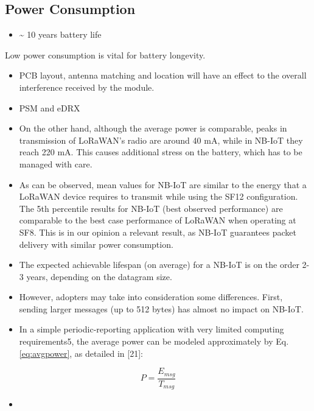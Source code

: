 \documentclass[]{article}
\providecommand{\tightlist}{%
  \setlength{\itemsep}{0pt}\setlength{\parskip}{0pt}}
\begin{document}
\hypertarget{power}{%
\subsection{Power Consumption}\label{power}}

\begin{itemize}
\tightlist
\item
  \textasciitilde{} 10 years battery life
\end{itemize}

Low power consumption is vital for battery longevity.

\begin{itemize}
\tightlist
\item
  PCB layout, antenna matching and location will have an effect to the
  overall interference received by the module.
\item
  PSM and eDRX
\item
  On the other hand, although the average power is comparable, peaks in
  transmission of LoRaWAN's radio are around 40 mA, while in NB-IoT they
  reach 220 mA. This causes additional stress on the battery, which has
  to be managed with care.
\item
  As can be observed, mean values for NB-IoT are similar to the energy
  that a LoRaWAN device requires to transmit while using the SF12
  configuration. The 5th percentile results for NB-IoT (best observed
  performance) are comparable to the best case performance of LoRaWAN
  when operating at SF8. This is in our opinion a relevant result, as
  NB-IoT guarantees packet delivery with similar power consumption.
\item
  The expected achievable lifespan (on average) for a NB-IoT is on the
  order 2-3 years, depending on the datagram size.
\item
  However, adopters may take into consideration some differences. First,
  sending larger messages (up to 512 bytes) has almost no impact on
  NB-IoT.
\item
  In a simple periodic-reporting application with very limited computing
  requirements5, the average power can be modeled approximately by Eq.
  \ref{eq:avgpower}, as detailed in {[}21{]}:
\end{itemize}

\begin{equation}P = \frac{E_{msg}}{T_{msg}}\label{eq:avgpower}\end{equation}

\begin{itemize}
\item
\end{itemize}
\end{document}
